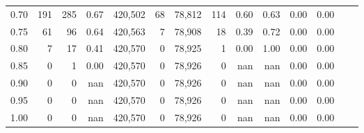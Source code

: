 \begin{tabular}{rrrrrrrrrrrrrr}
0.70 &      191 &     285 &    0.67 &  420,502 &       68 &  78,812 &     114 &  0.60 &  0.63 &  0.00 &      0.00 \\
0.75 &       61 &      96 &    0.64 &  420,563 &        7 &  78,908 &      18 &  0.39 &  0.72 &  0.00 &      0.00 \\
0.80 &        7 &      17 &    0.41 &  420,570 &        0 &  78,925 &       1 &  0.00 &  1.00 &  0.00 &      0.00 \\
0.85 &        0 &       1 &    0.00 &  420,570 &        0 &  78,926 &       0 &   nan &   nan &  0.00 &      0.00 \\
0.90 &        0 &       0 &     nan &  420,570 &        0 &  78,926 &       0 &   nan &   nan &  0.00 &      0.00 \\
0.95 &        0 &       0 &     nan &  420,570 &        0 &  78,926 &       0 &   nan &   nan &  0.00 &      0.00 \\
1.00 &        0 &       0 &     nan &  420,570 &        0 &  78,926 &       0 &   nan &   nan &  0.00 &      0.00 \\
\bottomrule
\end{tabular}
